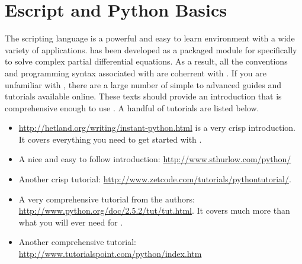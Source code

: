 
%
%
%

\section{Escript and Python Basics} \label{sec:escpybas}

The \pyt scripting language is a powerful and easy to learn environment with a wide variety of applications. \esc has been developed as a packaged module for \pyt specifically to solve complex partial differential equations. As a result, all the conventions and programming syntax associated with \pyt are coherrent with \esc. If you are unfamiliar with \pyt, there are a large number of simple to advanced guides and tutorials available online. These texts should provide an introduction that is comprehensive enough to use \esc. A handful of \pyt tutorials are listed below.
\begin{itemize}
\item \url{http://hetland.org/writing/instant-python.html} is a very crisp introduction. It covers everything you need to get started with \esc.
\item A nice and easy to follow introduction: \url{http://www.sthurlow.com/python/}
\item Another crisp tutorial: \url{http://www.zetcode.com/tutorials/pythontutorial/}. 
 \item A very comprehensive tutorial from the \pyt authors: \url{http://www.python.org/doc/2.5.2/tut/tut.html}. It covers much more than what you will ever need for \esc.
\item Another comprehensive tutorial: \url{http://www.tutorialspoint.com/python/index.htm}
\end{itemize} 

